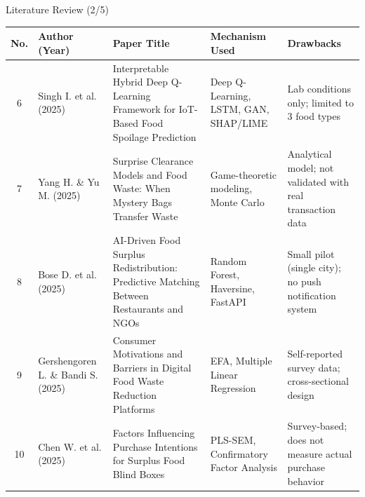 \documentclass[aspectratio=169,xcolor=dvipsnames]{beamer}
\begin{document}
\begin{frame}{Literature Review (2/5)}
\scriptsize
\renewcommand{\arraystretch}{1.35}
\setlength{\tabcolsep}{2.5pt}

\begin{tabular}{|c|p{1.7cm}|p{3.8cm}|p{3.2cm}|p{3.5cm}|}
\hline
\textbf{No.} &
\textbf{Author (Year)} &
\textbf{Paper Title} &
\textbf{Mechanism Used} &
\textbf{Drawbacks} \\
\hline

6 &
Singh I. et al. (2025) &
Interpretable Hybrid Deep Q-Learning Framework for IoT-Based Food Spoilage Prediction &
Deep Q-Learning, LSTM, GAN, SHAP/LIME &
Lab conditions only; limited to 3 food types \\
\hline

7 &
Yang H. \& Yu M. (2025) &
Surprise Clearance Models and Food Waste: When Mystery Bags Transfer Waste &
Game-theoretic modeling, Monte Carlo &
Analytical model; not validated with real transaction data \\
\hline

8 &
Bose D. et al. (2025) &
AI-Driven Food Surplus Redistribution: Predictive Matching Between Restaurants and NGOs &
Random Forest, Haversine, FastAPI &
Small pilot (single city); no push notification system \\
\hline

9 &
Gershengoren L. \& Bandi S. (2025) &
Consumer Motivations and Barriers in Digital Food Waste Reduction Platforms &
EFA, Multiple Linear Regression &
Self-reported survey data; cross-sectional design \\
\hline

10 &
Chen W. et al. (2025) &
Factors Influencing Purchase Intentions for Surplus Food Blind Boxes &
PLS-SEM, Confirmatory Factor Analysis &
Survey-based; does not measure actual purchase behavior \\
\hline

\end{tabular}
\end{frame}
\end{document}
